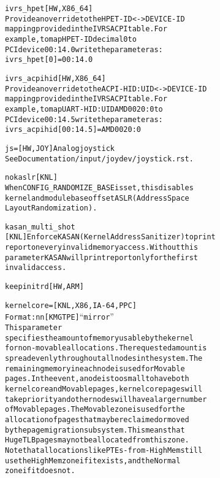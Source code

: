 \documentclass[a4paper,8pt,english]{sphinxmanual}
\begin{document}
\begin{alltt}
        ivrs\_hpet       {[}HW,X86\_64{]}
                        Provide an override to the HPET-ID\textless{}-\textgreater{}DEVICE-ID
                        mapping provided in the IVRS ACPI table. For
                        example, to map HPET-ID decimal 0 to
                        PCI device 00:14.0 write the parameter as:
                                ivrs\_hpet{[}0{]}=00:14.0

        ivrs\_acpihid    {[}HW,X86\_64{]}
                        Provide an override to the ACPI-HID:UID\textless{}-\textgreater{}DEVICE-ID
                        mapping provided in the IVRS ACPI table. For
                        example, to map UART-HID:UID AMD0020:0 to
                        PCI device 00:14.5 write the parameter as:
                                ivrs\_acpihid{[}00:14.5{]}=AMD0020:0

        js=             {[}HW,JOY{]} Analog joystick
                        See Documentation/input/joydev/joystick.rst.

        nokaslr         {[}KNL{]}
                        When CONFIG\_RANDOMIZE\_BASE is set, this disables
                        kernel and module base offset ASLR (Address Space
                        Layout Randomization).

        kasan\_multi\_shot
                        {[}KNL{]} Enforce KASAN (Kernel Address Sanitizer) to print
                        report on every invalid memory access. Without this
                        parameter KASAN will print report only for the first
                        invalid access.

        keepinitrd      {[}HW,ARM{]}

        kernelcore=     {[}KNL,X86,IA-64,PPC{]}
                        Format: nn{[}KMGTPE{]} \textbar{} ``mirror''
                        This parameter
                        specifies the amount of memory usable by the kernel
                        for non-movable allocations.  The requested amount is
                        spread evenly throughout all nodes in the system. The
                        remaining memory in each node is used for Movable
                        pages. In the event, a node is too small to have both
                        kernelcore and Movable pages, kernelcore pages will
                        take priority and other nodes will have a larger number
                        of Movable pages.  The Movable zone is used for the
                        allocation of pages that may be reclaimed or moved
                        by the page migration subsystem.  This means that
                        HugeTLB pages may not be allocated from this zone.
                        Note that allocations like PTEs-from-HighMem still
                        use the HighMem zone if it exists, and the Normal
                        zone if it does not.


\end{alltt}
\end{document}
